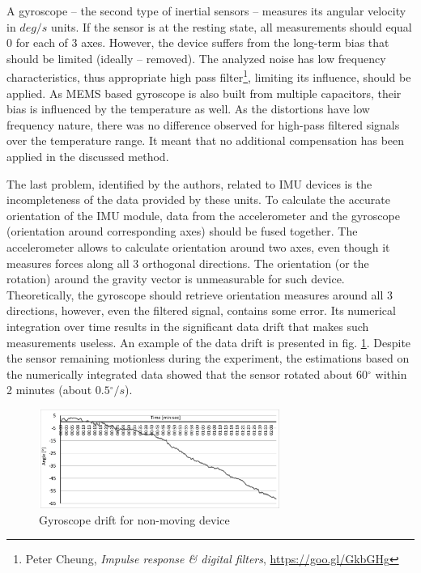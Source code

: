 \documentclass[sensors,article,submit,moreauthors,pdftex,10pt,a4paper]{mdpi}
\newcommand{\degree}{\ensuremath{{}^{\circ}}\xspace}
\begin{document}
	A gyroscope – the second type of inertial sensors – measures its angular velocity in $deg/s$  units. If the sensor is at the resting state, all measurements should equal 0 for each of 3 axes. However, the device suffers from the long-term bias that should be limited (ideally – removed). The analyzed noise has low frequency characteristics, thus appropriate high pass filter\footnote{Peter Cheung, \textit{Impulse response \& digital filters}, \url{https://goo.gl/GkbGHg}}, limiting its influence, should be applied. As MEMS based gyroscope is also built from multiple capacitors, their bias is influenced by the temperature as well. As the distortions have low frequency nature, there was no difference observed for high-pass filtered signals over the temperature range. It meant that no additional compensation has been applied in the discussed method. 
	
	The last problem, identified by the authors, related to IMU devices is the incompleteness of the data provided by these units. To calculate the accurate orientation of the IMU module, data from the accelerometer and the gyroscope (orientation around corresponding axes) should be fused together. The accelerometer allows to calculate orientation around two axes, even though it measures forces along all 3 orthogonal directions. The orientation (or the rotation) around the gravity vector is unmeasurable for such device. Theoretically, the gyroscope should retrieve orientation measures around all 3 directions, however, even the filtered signal, contains some error. Its numerical integration over time results in the significant data drift that makes such measurements useless. An example of the data drift is presented in fig. \ref{fig:imu:drift}. Despite the sensor remaining motionless during the experiment, the estimations based on the numerically integrated data showed that the sensor rotated about $60\degree$ within 2 minutes (about $0.5\degree/s$).
	\begin{figure}[H]
		\centering
		\includegraphics[width=0.7\textwidth]{Figure7.png}
		\caption{Gyroscope drift for non-moving device}
		\label{fig:imu:drift}
	\end{figure}
	
\end{document}

